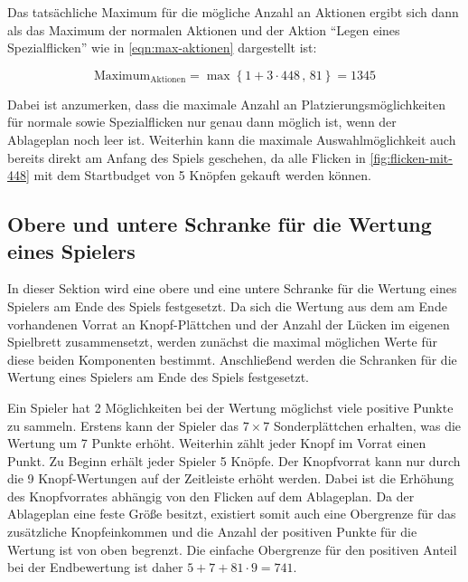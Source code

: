 Das tatsächliche Maximum für die mögliche Anzahl an Aktionen ergibt sich dann als das Maximum der normalen Aktionen und der Aktion \enquote{Legen eines Spezialflicken} wie in \ref{eqn:max-aktionen} dargestellt ist:

\vspace*{-0.4cm}
\begin{equation}
    \label{eqn:max-aktionen}
    \text{Maximum}_{\text{Aktionen}} = \max \left\{ 1 + 3 \cdot 448\, ,\, 81 \right\} = 1345
\end{equation}

Dabei ist anzumerken, dass die maximale Anzahl an Platzierungsmöglichkeiten für normale sowie Spezialflicken nur genau dann möglich ist, wenn der Ablageplan noch leer ist. Weiterhin kann die maximale Auswahlmöglichkeit auch bereits direkt am Anfang des Spiels geschehen, da alle Flicken in \ref{fig:flicken-mit-448} mit dem Startbudget von 5 Knöpfen gekauft werden können.

\subsection*{Obere und untere Schranke für die Wertung eines Spielers}

In dieser Sektion wird eine obere und eine untere Schranke für die Wertung eines Spielers am Ende des Spiels festgesetzt. Da sich die Wertung aus dem am Ende vorhandenen Vorrat an Knopf-Plättchen und der Anzahl der Lücken im eigenen Spielbrett zusammensetzt, werden zunächst die maximal möglichen Werte für diese beiden Komponenten bestimmt. Anschließend werden die Schranken für die Wertung eines Spielers am Ende des Spiels festgesetzt.

Ein Spieler hat 2 Möglichkeiten bei der Wertung möglichst viele positive Punkte zu sammeln. Erstens kann der Spieler das $7 \times 7$ Sonderplättchen erhalten, was die Wertung um 7 Punkte erhöht. Weiterhin zählt jeder Knopf im Vorrat einen Punkt. Zu Beginn erhält jeder Spieler 5 Knöpfe. Der Knopfvorrat kann nur durch die 9 Knopf-Wertungen auf der Zeitleiste erhöht werden. Dabei ist die Erhöhung des Knopfvorrates abhängig von den Flicken auf dem Ablageplan. Da der Ablageplan eine feste Größe besitzt, existiert somit auch eine Obergrenze für das zusätzliche Knopfeinkommen und die Anzahl der positiven Punkte für die Wertung ist von oben begrenzt. Die einfache Obergrenze für den positiven Anteil bei der Endbewertung ist daher $5+7+81\cdot 9=741$.

